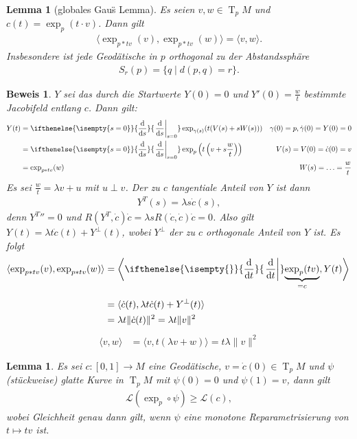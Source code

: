 \documentclass[paper=A4, twoside, chapterprefix=true, bibliography=totoc, headsepline]{scrbook}
\DeclareMathOperator{\T}{T}         %
\newcommand{\dop}{\mathrm{d}}
\newcommand{\difffrac}[3][]{\ifthenelse{\isempty{#1}}{\frac{\dop #2}{\dop #3}}{\left. \frac{\dop #2}{\dop #3} \right|_{#1}}}
\theoremstyle{plain}
\newtheorem{Lemma}[Dfn]{Lemma}
\theoremstyle{nonumberplain}
\newtheorem{bew}{Beweis}
\theoremstyle{empty}
\theoremstyle{break}
\begin{document}
\begin{Lemma}[globales Gau\"s Lemma]
  Es seien $v, w \in \T_pM$ und $c(t) = \exp_p(t \cdot v)$.
  Dann gilt
  \begin{align*}
    \langle \exp_{p*tv}(v), \exp_{p*tv}(w) \rangle = \langle v, w \rangle.
  \end{align*}
  Insbesondere ist jede Geod\"atische in $p$ orthogonal zu der Abstandssph\"are
  \begin{align*}
    S_r(p) = \{ q \mid d(p, q) = r \}.
  \end{align*}
\end{Lemma}

\begin{bew}
  $Y$ sei das durch die Startwerte $Y(0) = 0$ und $Y'(0) = \frac{w}{t}$ bestimmte Jacobifeld entlang $c$.
  Dann gilt:
  \begin{align*}
    Y(t) &= \difffrac[s=0]{}{s} \exp_{\gamma(s)}(t(V(s) + sW(s))) & \gamma(0) = p, \dot\gamma(0) = Y(0) = 0\\
    &= \difffrac[s=0]{}{s} \exp_p\left(t \left(v + s \frac{w}{t}\right)\right) & V(s) = V(0) = \dot c(0) = v\\
    &= \exp_{p*tv}(w) & W(s) = \ldots = \frac{w}{t}
  \end{align*}
  Es sei $\frac{w}{t} = \lambda v + u$ mit $u \perp v$.
  Der zu $c$ tangentiale Anteil von $Y$ ist dann
  \begin{align*}
    Y^T(s) = \lambda s \dot c (s),
  \end{align*}
  denn ${Y^T}{''} = 0$ und $R(Y^T, \dot c) \dot c = \lambda s R(\dot c, \dot c) \dot c = 0$.
  Also gilt $Y(t) = \lambda t \dot c(t) + Y^\perp(t)$, wobei $Y^\perp$ der zu $c$ orthogonale Anteil von $Y$ ist. Es folgt
  \begin{align*}
    \langle \exp_{p*tv}(v), \exp_{p*tv}(w) \rangle &= \left\langle \difffrac{}{t} \smash{\underbrace{\exp_p(tv)}_{=c}}, Y(t) \right\rangle \vphantom{\underbrace{\difffrac{}{}}_{a}} \\
    &= \langle \dot c(t), \lambda t \dot c(t) + Y^\perp(t) \rangle \\
    &= \lambda t \|\dot c(t) \|^2 = \lambda t \|v\|^2 \\
  \end{align*}
  \begin{align*}
    \langle v, w \rangle &= \langle v, t(\lambda v + w) \rangle = t \lambda \|v\|^2
  \end{align*}
\end{bew}

\begin{Lemma}\label{thm:lemma-9-10}
  Es sei $c \colon [0,1] \to M$ eine Geod\"atische, $v = \dot c(0) \in \T_{p}M$ und $\psi$ (st\"uckweise) glatte Kurve in $\T_pM$ mit $\psi(0) = 0$ und $\psi(1) = v$, dann gilt
  \begin{align*}
    \mathcal L(\exp_p \circ \psi) \geq \mathcal L(c),
  \end{align*}
  wobei Gleichheit genau dann gilt, wenn $\psi$ eine monotone Reparametrisierung von $t \mapsto tv$ ist.
\end{Lemma}
\end{document}
